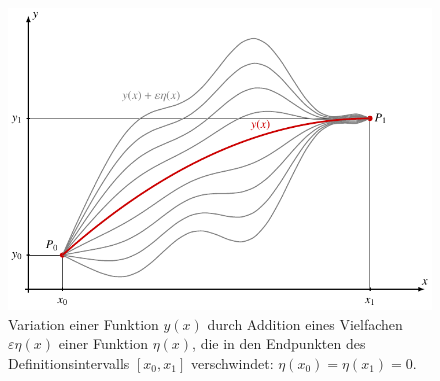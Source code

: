 %
%
%
\begin{figure}
\centering
\includegraphics{chapters/020-variation/images/variation0.pdf}
\caption{Variation einer Funktion $y(x)$ durch Addition eines Vielfachen
$\varepsilon\eta(x)$ einer Funktion $\eta(x)$, die in den Endpunkten
des Definitionsintervalls $[x_0,x_1]$ verschwindet: $\eta(x_0)=\eta(x_1)=0$.
\label{buch:variation:fig:variation0}}
\end{figure}
